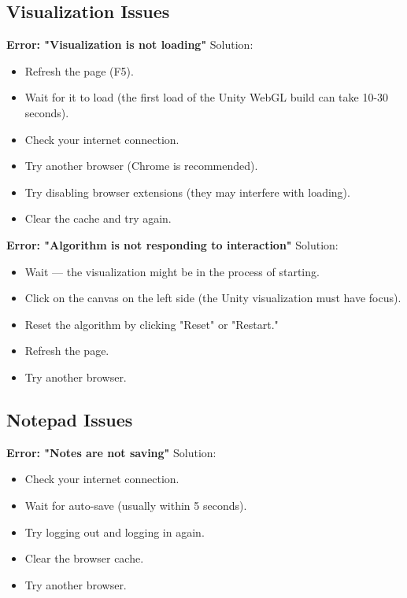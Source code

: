 \subsection{Visualization Issues}

\textbf{Error: "Visualization is not loading"}\newline
Solution:
\begin{itemize}
  \item Refresh the page (F5).
  \item Wait for it to load (the first load of the Unity WebGL build can take 10-30 seconds).
  \item Check your internet connection.
  \item Try another browser (Chrome is recommended).
  \item Try disabling browser extensions (they may interfere with loading).
  \item Clear the cache and try again.
\end{itemize}

\textbf{Error: "Algorithm is not responding to interaction"}\newline
Solution:
\begin{itemize}
  \item Wait — the visualization might be in the process of starting.
  \item Click on the canvas on the left side (the Unity visualization must have focus).
  \item Reset the algorithm by clicking "Reset" or "Restart."
  \item Refresh the page.
  \item Try another browser.
\end{itemize}

\subsection{Notepad Issues}

\textbf{Error: "Notes are not saving"}\newline
Solution:
\begin{itemize}
  \item Check your internet connection.
  \item Wait for auto-save (usually within 5 seconds).
  \item Try logging out and logging in again.
  \item Clear the browser cache.
  \item Try another browser.
\end{itemize}

